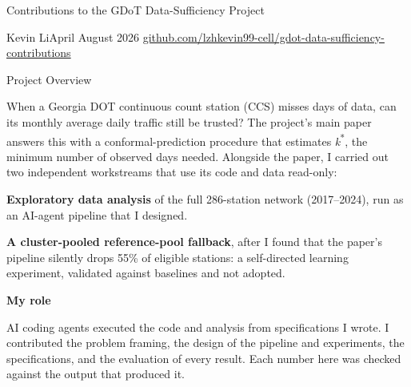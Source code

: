 \documentclass[10pt]{article}
\newcommand{\sectionhead}[1]{%
  \par\vspace{8pt}%
  {\headfont\fontsize{12.5}{15}\selectfont\color{navy}#1\par}%
  \vspace{2.5pt}{\color{rulegray}\hrule height 0.6pt}\vspace{4pt}}
\newlength{\itemgap}\setlength{\itemgap}{1.5pt}
\newenvironment{points}{\begin{list}{\textcolor{navy}{\small\textbullet}}{%
  \setlength{\leftmargin}{1.05em}\setlength{\labelwidth}{0.7em}%
  \setlength{\labelsep}{0.4em}\setlength{\itemsep}{\itemgap}%
  \setlength{\parsep}{0pt}\setlength{\topsep}{1pt}\setlength{\partopsep}{0pt}}}%
  {\end{list}}
\newcommand{\kstar}{\textit{k}\textsuperscript{*}}
\begin{document}
{\headfont\fontsize{18}{21}\selectfont\color{navy}Contributions to the GDoT Data-Sufficiency Project\par}
\vspace{4pt}
{\metafont\fontsize{9.5}{12}\selectfont\color{slate}%
{\color{body}Kevin Li}\quad\textbar\quad April\,\textendash\,August 2026\hfill
\href{https://github.com/lzhkevin99-cell/gdot-data-sufficiency-contributions}{github.com/lzhkevin99-cell/gdot-data-sufficiency-contributions}\par}
\vspace{0pt}

\sectionhead{Project Overview}

When a Georgia DOT continuous count station (CCS) misses days of data, can its monthly average daily
traffic still be trusted? The project's main paper answers this with a conformal-prediction procedure
that estimates \kstar, the minimum number of observed days needed. Alongside the paper, I carried out
two independent workstreams that use its code and data read-only:
\begin{points}
  \item \textbf{Exploratory data analysis} of the full 286-station network (2017--2024), run as an
    AI-agent pipeline that I designed.
  \item \textbf{A cluster-pooled reference-pool fallback}, after I found that the paper's pipeline
    silently drops 55\% of eligible stations: a self-directed learning experiment, validated against
    baselines and not adopted.
\end{points}

\vspace{5pt}
\noindent\colorbox{tint}{\parbox{\dimexpr\linewidth-2\fboxsep\relax}{\vspace{2.5pt}%
  {\bfseries\fontsize{9.5}{12}\selectfont\color{navy}My role\par}\vspace{1pt}
  AI coding agents executed the code and analysis from specifications I wrote. I contributed the
  problem framing, the design of the pipeline and experiments, the specifications, and the evaluation
  of every result. Each number here was checked against the output that produced it.\vspace{2.5pt}}}
\end{document}
